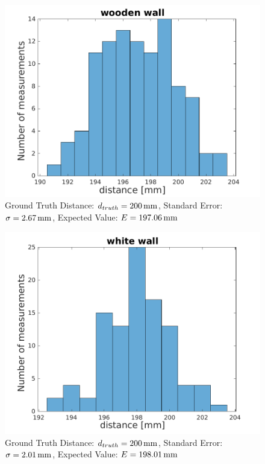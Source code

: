 \begin{figure}
		\centering
		\includegraphics[width=0.9\linewidth]{pictures/wooden_wall.pdf}
		\caption{Ground Truth Distance: $d_{truth}= \unit[200]{mm}$, Standard Error: $\sigma=\unit[2.67]{mm}$, Expected Value: $E=\unit[197.06]{mm}$}
		\label{fig:surface_hist_wood}
\end{figure}
\begin{figure}
		\centering
		\includegraphics[width=0.9\linewidth]{pictures/white_wall.pdf}
		\caption{Ground Truth Distance: $d_{truth}= \unit[200]{mm}$, Standard Error: $\sigma=\unit[2.01]{mm}$, Expected Value: $E=\unit[198.01]{mm}$}
		\label{fig:surface_hist_white}
\end{figure}
